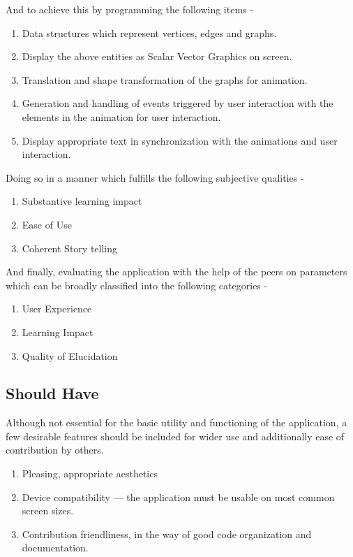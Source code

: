 And to achieve this by programming the following items -

\begin{enumerate}
\item Data structures which represent vertices, edges and graphs.
\item Display the above entities as Scalar Vector Graphics on screen.
\item Translation and shape transformation of the graphs for animation.
\item Generation and handling of events triggered by user interaction with the elements in the animation for user interaction.
\item Display appropriate text in synchronization with the animations and user interaction.
\end{enumerate}

Doing so in a manner which fulfills the following subjective qualities -

\begin{enumerate}
\item Substantive learning impact
\item Ease of Use
\item Coherent Story telling
\end{enumerate}

And finally, evaluating the application with the help of the peers on
parameters which can be broadly classified into the following categories -

\begin{enumerate}
\item User Experience
\item Learning Impact
\item Quality of Elucidation
\end{enumerate}

\subsection{Should Have}
\label{requirements: shouldhave}
Although not essential for the basic utility and functioning of
the application, a few desirable features should be included for wider use and
additionally ease of contribution by others. 
\begin{enumerate}
\item Pleasing, appropriate aesthetics
\item Device compatibility --- the application must be usable on most common screen sizes.
\item Contribution friendliness, in the way of good code organization and documentation.
\end{enumerate}


